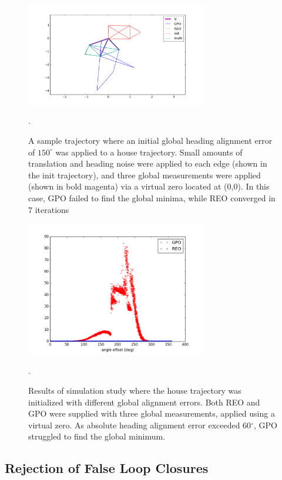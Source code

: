 \begin{figure}[H]
  \includegraphics[width=0.7\textwidth]{figures/global_heading_trajectory.png}
  \caption{A sample trajectory where an initial global heading alignment error of $150^\circ$ was applied to a house trajectory.  Small amounts of translation and heading noise were applied to each edge (shown in the init trajectory), and three global measurements were applied (shown in bold magenta) via a virtual zero located at (0,0).  In this case, GPO failed to find the global minima, while REO converged in 7 iterations}
  \label{fig:global_heading_error_trajectory}.
\end{figure}

\begin{figure}[H]
  \includegraphics[width=0.7\textwidth]{figures/REO_vs_GPO_global_measurement.png}
  \caption{Results of simulation study where the house trajectory was initialized with different global alignment errors.  Both REO and GPO were supplied with three global measurements, applied using a virtual zero.  As absolute heading alignment error exceeded 60$^\circ$, GPO struggled to find the global minimum.}
  \label{fig:global_heading_error_results}.
\end{figure}

\subsection{Rejection of False Loop Closures}

